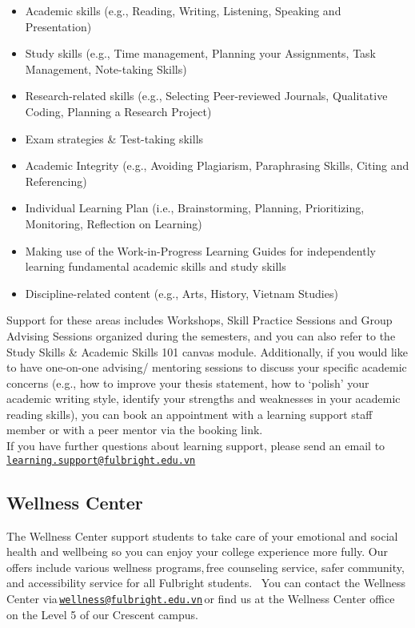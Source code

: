 \documentclass[
]{article}
\providecommand{\tightlist}{%
  \setlength{\itemsep}{0pt}\setlength{\parskip}{0pt}}
\begin{document}
\begin{itemize}
\tightlist
\item
  Academic skills (e.g., Reading, Writing, Listening, Speaking and Presentation)
\item
  Study skills (e.g., Time management, Planning your Assignments, Task Management, Note-taking Skills)\\
\item
  Research-related skills (e.g., Selecting Peer-reviewed Journals, Qualitative Coding, Planning a Research Project)
\item
  Exam strategies \& Test-taking skills\\
\item
  Academic Integrity (e.g., Avoiding Plagiarism, Paraphrasing Skills, Citing and Referencing)
\item
  Individual Learning Plan (i.e., Brainstorming, Planning, Prioritizing, Monitoring, Reflection on Learning)
\item
  Making use of the Work-in-Progress Learning Guides for independently learning fundamental academic skills and study skills
\item
  Discipline-related content (e.g., Arts, History, Vietnam Studies)
\end{itemize}

Support for these areas includes Workshops, Skill Practice Sessions and Group Advising Sessions organized during the semesters, and you can also refer to the Study Skills \& Academic Skills 101 canvas module. Additionally, if you would like to have one-on-one advising/ mentoring sessions to discuss your specific academic concerns (e.g., how to improve your thesis statement, how to `polish' your academic writing style, identify your strengths and weaknesses in your academic reading skills), you can book an appointment with a learning support staff member or with a peer mentor via the booking link.\\
If you have further questions about learning support, please send an email to \href{mailto:learning.support@fulbright.edu.vn}{\nolinkurl{learning.support@fulbright.edu.vn}}

\subsection*{Wellness Center}\label{wellness-center}

The Wellness Center support students to take care of your emotional and social health and wellbeing so you can enjoy your college experience more fully. Our offers include various wellness programs,\,free counseling service, safer community, and accessibility service for all Fulbright students.
\,
You can contact the Wellness Center via\,\href{mailto:wellness@fulbright.edu.vn}{\nolinkurl{wellness@fulbright.edu.vn}}\,or find us at the Wellness Center office on the Level 5 of our Crescent campus.
\,
\end{document}
